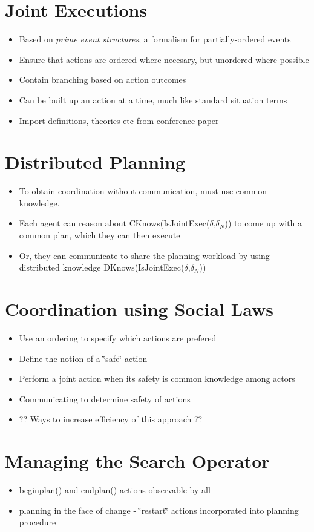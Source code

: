 \section{Joint Executions}

\begin{itemize}
\item Based on \emph{prime event structures}, a formalism for partially-ordered
events
\item Ensure that actions are ordered where necesary, but unordered where
possible
\item Contain branching based on action outcomes
\item Can be built up an action at a time, much like standard situation
terms
\item Import definitions, theories etc from conference paper
\end{itemize}

\section{Distributed Planning}

\begin{itemize}
\item To obtain coordination without communication, must use common knowledge. 
\item Each agent can reason about CKnows(IsJointExec($\delta$,$\delta_{N}$))
to come up with a common plan, which they can then execute 
\item Or, they can communicate to share the planning workload by using distributed
knowledge DKnows(IsJointExec($\delta$,$\delta_{N}$)) 
\end{itemize}

\section{Coordination using Social Laws}

\begin{itemize}
\item Use an ordering to specify which actions are prefered 
\item Define the notion of a \char`\"{}safe\char`\"{} action 
\item Perform a joint action when its safety is common knowledge among actors 
\item Communicating to determine safety of actions 
\item ?? Ways to increase efficiency of this approach ?? 
\end{itemize}

\section{Managing the Search Operator}

\begin{itemize}
\item beginplan() and endplan() actions observable by all 
\item planning in the face of change - \char`\"{}restart\char`\"{} actions
incorporated into planning procedure 
\end{itemize}
